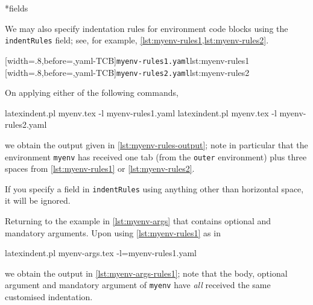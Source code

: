 *{fields}
 \begin{example}
 We may also specify indentation rules for environment code blocks using the
 \texttt{indentRules} field; see, for example, \cref{lst:myenv-rules1,lst:myenv-rules2}.

 \begin{cmhtcbraster}[raster column skip=.1\linewidth]
  [width=.8\linewidth,before=\centering,yaml-TCB]{\texttt{myenv-rules1.yaml}}{lst:myenv-rules1}
  [width=.8\linewidth,before=\centering,yaml-TCB]{\texttt{myenv-rules2.yaml}}{lst:myenv-rules2}
 \end{cmhtcbraster}

 On applying either of the following commands, 

 \begin{commandshell}
latexindent.pl myenv.tex -l myenv-rules1.yaml  
latexindent.pl myenv.tex -l myenv-rules2.yaml  
\end{commandshell}

 we obtain the output given in \cref{lst:myenv-rules-output}; note in particular that the
 environment \texttt{myenv} has received one tab (from the \texttt{outer} environment)
 plus three spaces from \cref{lst:myenv-rules1} or \ref{lst:myenv-rules2}.

 \end{example}

 If you specify a field in \texttt{indentRules} using anything other than horizontal
 space, it will be ignored.

 \begin{example}
 Returning to the example in \cref{lst:myenv-args} that contains optional and mandatory
 arguments. Upon using \cref{lst:myenv-rules1} as in 

 \begin{commandshell}
latexindent.pl myenv-args.tex -l=myenv-rules1.yaml  
\end{commandshell}

 we obtain the output in \cref{lst:myenv-args-rules1}; note that the body, optional
 argument and mandatory argument of \texttt{myenv} have \emph{all} received the same
 customised indentation.
 \end{example}

